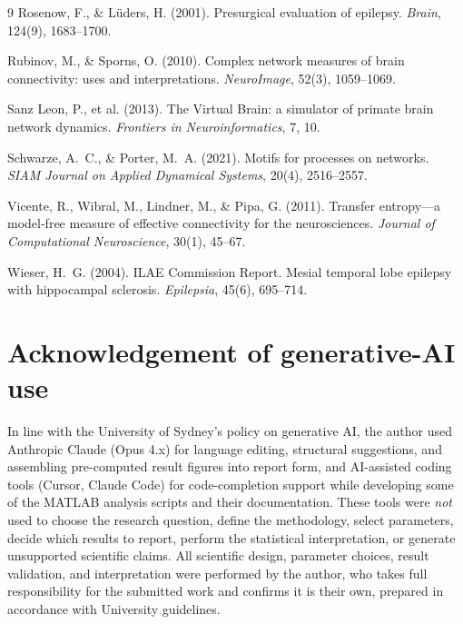 \documentclass[11pt,a4paper]{article}
\begin{document}
\begin{thebibliography}{9}
 Rosenow, F., \& L\"uders, H. (2001). Presurgical evaluation of epilepsy. \emph{Brain}, 124(9), 1683--1700.

 Rubinov, M., \& Sporns, O. (2010). Complex network
measures of brain connectivity: uses and interpretations. \emph{NeuroImage}, 52(3), 1059--1069.

 Sanz Leon, P., et al. (2013). The Virtual Brain: a
simulator of primate brain network dynamics. \emph{Frontiers in Neuroinformatics}, 7, 10.

 Schwarze, A.~C., \& Porter, M.~A. (2021). Motifs for
processes on networks. \emph{SIAM Journal on Applied Dynamical Systems}, 20(4), 2516--2557.

 Vicente, R., Wibral, M., Lindner, M., \& Pipa, G. (2011). Transfer entropy---a model-free measure of effective connectivity for the neurosciences. \emph{Journal of Computational Neuroscience}, 30(1), 45--67.

 Wieser, H.~G. (2004). ILAE Commission Report. Mesial temporal lobe epilepsy with hippocampal sclerosis. \emph{Epilepsia}, 45(6), 695--714.
\end{thebibliography}

\appendix
\section{Acknowledgement of generative-AI use}
In line with the University of Sydney's policy on generative AI, the author used Anthropic Claude
(Opus 4.x) for language editing, structural suggestions, and assembling pre-computed result figures
into report form, and AI-assisted coding tools (Cursor, Claude Code) for code-completion support
while developing some of the MATLAB analysis scripts and their documentation. These tools were
\emph{not} used to choose the research question, define the methodology, select parameters, decide
which results to report, perform the statistical interpretation, or generate unsupported scientific
claims. All scientific design, parameter choices, result validation, and interpretation were
performed by the author, who takes full responsibility for the submitted work and confirms it is
their own, prepared in accordance with University guidelines.
\end{document}
